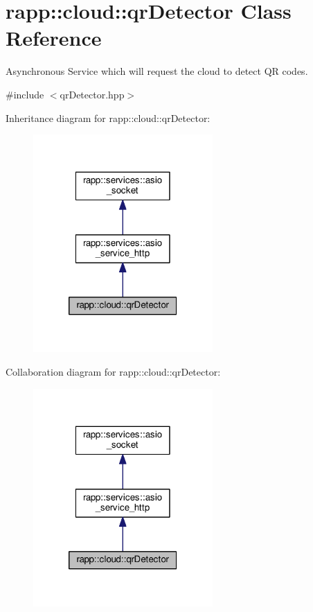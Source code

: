 \hypertarget{classrapp_1_1cloud_1_1qrDetector}{\section{rapp\-:\-:cloud\-:\-:qr\-Detector Class Reference}
\label{classrapp_1_1cloud_1_1qrDetector}
}


Asynchronous Service which will request the cloud to detect Q\-R codes.  




{\ttfamily \#include $<$qr\-Detector.\-hpp$>$}



Inheritance diagram for rapp\-:\-:cloud\-:\-:qr\-Detector\-:
\nopagebreak
\begin{figure}[H]
\begin{center}
\leavevmode
\includegraphics[width=194pt]{classrapp_1_1cloud_1_1qrDetector__inherit__graph}
\end{center}
\end{figure}


Collaboration diagram for rapp\-:\-:cloud\-:\-:qr\-Detector\-:
\nopagebreak
\begin{figure}[H]
\begin{center}
\leavevmode
\includegraphics[width=194pt]{classrapp_1_1cloud_1_1qrDetector__coll__graph}
\end{center}
\end{figure}
